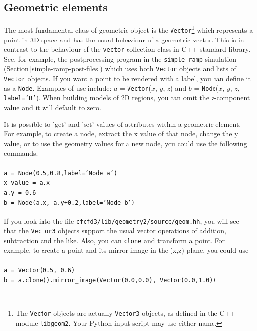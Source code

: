 \subsection{Geometric elements}
%
The most fundamental class of geometric object is 
the \texttt{Vector}\footnote{
 The \texttt{Vector} objects are actually \texttt{Vector3} 
 objects, as defined in the C++ module \texttt{libgeom2}.
 Your Python input script may use either name.
}
which represents a point in 3D space and has the usual behaviour 
of a geometric vector.
This is in contrast to the behaviour of the \texttt{vector} collection class in C++ standard library.
See, for example, the postprocessing program in the \texttt{simple\_ramp}
simulation (Section\,\ref{simple-ramp-post-files}) which uses both \texttt{Vector} objects
and lists of \texttt{Vector} objects.
If you want a point to be rendered with a label, you can define it as a \texttt{Node}.
Examples of use include: $a$ = \texttt{Vector}($x$, $y$, $z$) and
$b$ = \texttt{Node}($x$, $y$, $z$, \texttt{label='B'}).
When building models of 2D regions, you can omit the z-component value and it will default
to zero.

\medskip
It is possible to 'get' and 'set' values of attributes within a geometric element. 
For example, to create a node, extract the x value of that node,
change the y value, or to use the geometry values for a new node,
you could use the following commands.\\
\topbar\\
\texttt{a = Node(0.5,0.8,label='Node a')}\\
\texttt{x-value = a.x}\\
\texttt{a.y = 0.6}\\
\texttt{b = Node(a.x, a.y+0.2,label='Node b')}\\
\bottombar\\

\medskip
If you look into the file \texttt{cfcfd3/lib/geometry2/source/geom.hh}, you will see that
the \texttt{Vector3} objects support the usual vector operations of addition, subtraction and the like.
Also, you can \texttt{clone} and transform a point.
For example, to create a point and its mirror image in the (x,z)-plane, you could use\\
\topbar\\
\texttt{a = Vector(0.5, 0.6)}\\
\texttt{b = a.clone().mirror\_image(Vector(0.0,0.0), Vector(0.0,1.0))}\\
\bottombar\\
 
